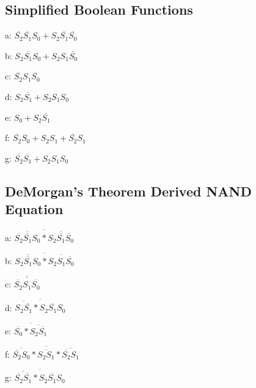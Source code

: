 \documentclass[11pt,a4paper]{article}
\begin{document}
\subsection{Simplified Boolean Functions}
a: $\overline{S_2}\overline{S_1}S_0 + S_2\overline{S_1}\overline{S_0}$

b: $S_2\overline{S_1}S_0 + S_2S_1\overline{S_0}$

c: $\overline{S_2}S_1\overline{S_0}$

d: $S_2\overline{S_1} + S_2S_1S_0$

e: $S_0 + S_2\overline{S_1}$

f: $\overline{S_2}S_0 + S_2S_1 + \overline{S_2}S_1$

g: $\overline{S_2}\overline{S_1} + S_2S_1S_0$

\subsection{DeMorgan's Theorem Derived NAND Equation}
a: $\overline{\overline{\overline{S_2}\overline{S_1}S_0} * \overline{S_2\overline{S_1}\overline{S_0}}}$

b: $\overline{\overline{S_2\overline{S_1}S_0} * \overline{S_2S_1\overline{S_0}}}$

c: $\overline{\overline{\overline{S_2}S_1\overline{S_0}}}$

d: $\overline{\overline{S_2\overline{S_1}} * \overline{S_2S_1S_0}}$

e: $\overline{\overline{S_0} * \overline{S_2\overline{S_1}}}$

f: $\overline{\overline{\overline{S_2}S_0} * \overline{S_2S_1} * \overline{\overline{S_2}S_1}}$

g: $\overline{\overline{\overline{S_2}\overline{S_1}} * \overline{S_2S_1S_0}}$
\end{document}
